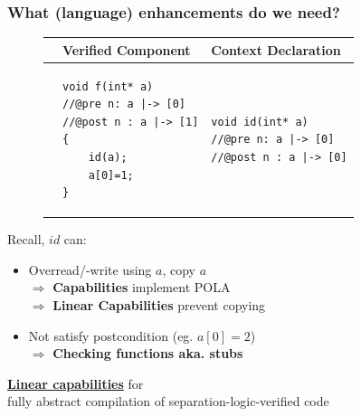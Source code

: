 \documentclass{beamer}
\begin{document}
\begin{frame}[fragile]
\frametitle{What (language) enhancements do we need?}
\begin{figure}[ht]
\begin{tabular}{c|M{.4\textwidth}|M{.4\textwidth}}
& \textbf{Verified Component}  & \textbf{Context Declaration} \\
\hline%
&
{\begin{lstlisting}[style=CStyle,numbers=none,belowskip=-1em]
void f(int* a)
//@pre n: a |-> [0]  
//@post n : a |-> [1]
{
	id(a); 
	a[0]=1;
}
\end{lstlisting}}
&
{\begin{lstlisting}[style=CStyle,numbers=none,belowskip=-1em]
void id(int* a)
//@pre n: a |-> [0]  
//@post n : a |-> [0]
\end{lstlisting}}\\
\end{tabular} 
\label{trivialexample}
\end{figure} %
Recall, $id$ can:
	\begin{itemize}
	\item Overread/-write using $a$, copy $a$\\
	\quad $\Rightarrow$ \textbf{Capabilities} implement POLA\\
	\quad $\Rightarrow$ \textbf{Linear Capabilities} prevent copying
	\item Not satisfy postcondition (eg. $a[0] =2$)\\
	\quad $\Rightarrow$ \textbf{Checking functions aka. stubs}
	\end{itemize}
\end{frame}

\begin{frame}[plain,c]

\begin{center}
\Huge \underline{\textbf{Linear capabilities}} for\\  fully abstract
compilation of separation-logic-verified code
\end{center}

\end{frame}


\end{document}
